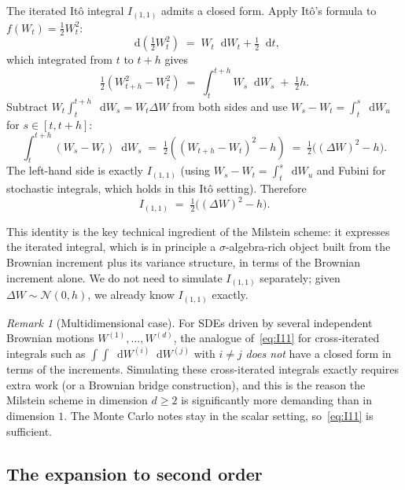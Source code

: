 \documentclass[11pt,a4paper]{article}
\theoremstyle{plain}
\theoremstyle{definition}
\theoremstyle{remark}
\newtheorem{remark}[theorem]{Remark}
\newcommand{\dd}{\mathop{}\!\mathrm{d}}
\begin{document}
The iterated It\^o integral $I_{(1,1)}$ admits a closed form. Apply
It\^o's formula to $f(W_t) = \tfrac{1}{2} W_t^2$:
\begin{equation}
\dd \!\left(\tfrac{1}{2} W_t^2\right) \;=\; W_t \dd W_t + \tfrac{1}{2} \dd t,
\end{equation}
which integrated from $t$ to $t+h$ gives
\begin{equation}
\tfrac{1}{2}(W_{t+h}^2 - W_t^2) \;=\; \int_t^{t+h} W_s \dd W_s
\;+\; \tfrac{1}{2} h.
\end{equation}
Subtract $W_t \int_t^{t+h} \dd W_s = W_t \Delta W$ from both sides
and use $W_s - W_t = \int_t^s \dd W_u$ for $s \in [t, t+h]$:
\begin{equation}
\int_t^{t+h} (W_s - W_t) \dd W_s
\;=\; \tfrac{1}{2}((W_{t+h} - W_t)^2 - h)
\;=\; \tfrac{1}{2}\big((\Delta W)^2 - h\big).
\end{equation}
The left-hand side is exactly $I_{(1,1)}$ (using
$W_s - W_t = \int_t^s \dd W_u$ and Fubini for stochastic integrals,
which holds in this It\^o setting). Therefore
\begin{equation}
\label{eq:I11}
I_{(1,1)} \;=\; \tfrac{1}{2}\big( (\Delta W)^2 - h \big).
\end{equation}

This identity is the key technical ingredient of the Milstein scheme:
it expresses the iterated integral, which is in principle a
$\sigma$-algebra-rich object built from the Brownian increment plus
its variance structure, in terms of the Brownian increment alone. We
do not need to simulate $I_{(1,1)}$ separately; given $\Delta W \sim
\mathcal{N}(0, h)$, we already know $I_{(1,1)}$ exactly.

\begin{remark}[Multidimensional case]
For SDEs driven by several independent Brownian motions $W^{(1)},
\dots, W^{(d)}$, the analogue of~\eqref{eq:I11} for cross-iterated
integrals such as $\int\!\int \dd W^{(i)} \dd W^{(j)}$ with $i \neq j$
\emph{does not} have a closed form in terms of the increments.
Simulating these cross-iterated integrals exactly requires extra work
(or a Brownian bridge construction), and this is the reason the
Milstein scheme in dimension $d \geq 2$ is significantly more
demanding than in dimension $1$. The Monte Carlo notes stay in the
scalar setting, so~\eqref{eq:I11} is sufficient.
\end{remark}

\subsection{The expansion to second order}
\end{document}
